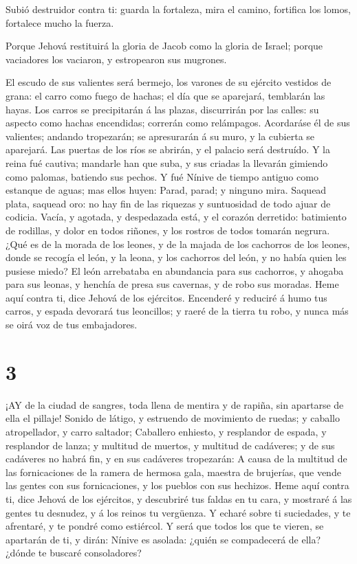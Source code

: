  Subió destruidor contra ti: guarda la fortaleza, mira el
camino, fortifica los lomos, fortalece mucho la fuerza.

 Porque Jehová restituirá la gloria de Jacob como la gloria
de Israel; porque vaciadores los vaciaron, y estropearon sus mugrones.

 El escudo de sus valientes será bermejo, los varones de su
ejército vestidos de grana: el carro como fuego de hachas; el día que se
aparejará, temblarán las hayas.  Los carros se precipitarán
á las plazas, discurrirán por las calles: su aspecto como hachas
encendidas; correrán como relámpagos.  Acordaráse él de sus
valientes; andando tropezarán; se apresurarán á su muro, y la cubierta
se aparejará.  Las puertas de los ríos se abrirán, y el
palacio será destruído.  Y la reina fué cautiva; mandarle
han que suba, y sus criadas la llevarán gimiendo como palomas, batiendo
sus pechos.  Y fué Nínive de tiempo antiguo como estanque de
aguas; mas ellos huyen: Parad, parad; y ninguno mira. 
Saquead plata, saquead oro: no hay fin de las riquezas y suntuosidad de
todo ajuar de codicia.  Vacía, y agotada, y despedazada
está, y el corazón derretido: batimiento de rodillas, y dolor en todos
riñones, y los rostros de todos tomarán negrura.  ¿Qué es
de la morada de los leones, y de la majada de los cachorros de los
leones, donde se recogía el león, y la leona, y los cachorros del león,
y no había quien les pusiese miedo?  El león arrebataba en
abundancia para sus cachorros, y ahogaba para sus leonas, y henchía de
presa sus cavernas, y de robo sus moradas.  Heme aquí
contra ti, dice Jehová de los ejércitos. Encenderé y reduciré á humo tus
carros, y espada devorará tus leoncillos; y raeré de la tierra tu robo,
y nunca más se oirá voz de tus embajadores.

\hypertarget{section-2}{%
\section{3}\label{section-2}}

 ¡AY de la ciudad de sangres, toda llena de mentira y de
rapiña, sin apartarse de ella el pillaje!  Sonido de látigo,
y estruendo de movimiento de ruedas; y caballo atropellador, y carro
saltador;  Caballero enhiesto, y resplandor de espada, y
resplandor de lanza; y multitud de muertos, y multitud de cadáveres; y
de sus cadáveres no habrá fin, y en sus cadáveres tropezarán:
 A causa de la multitud de las fornicaciones de la ramera de
hermosa gala, maestra de brujerías, que vende las gentes con sus
fornicaciones, y los pueblos con sus hechizos.  Heme aquí
contra ti, dice Jehová de los ejércitos, y descubriré tus faldas en tu
cara, y mostraré á las gentes tu desnudez, y á los reinos tu vergüenza.
 Y echaré sobre ti suciedades, y te afrentaré, y te pondré
como estiércol.  Y será que todos los que te vieren, se
apartarán de ti, y dirán: Nínive es asolada: ¿quién se compadecerá de
ella? ¿dónde te buscaré consoladores?

